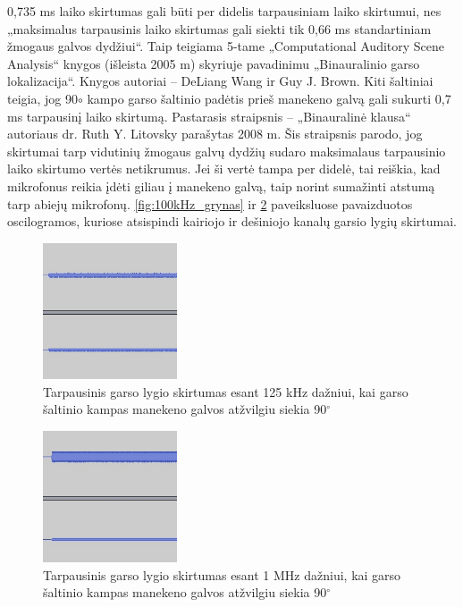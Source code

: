 \documentclass[]{vgtuef}
\begin{document}
0,735 ms laiko skirtumas gali būti per didelis tarpausiniam laiko skirtumui, nes „maksimalus tarpausinis laiko skirtumas gali siekti tik 0,66 ms standartiniam žmogaus galvos dydžiui“. Taip teigiama 5-tame „Computational Auditory Scene Analysis“ knygos (išleista 2005 m) skyriuje pavadinimu „Binauralinio garso lokalizacija“. Knygos autoriai – DeLiang Wang ir Guy J. Brown. Kiti šaltiniai teigia, jog 90$\circ$ kampo garso šaltinio padėtis prieš manekeno galvą gali sukurti 0,7 ms tarpausinį laiko skirtumą. Pastarasis straipsnis – „Binauralinė klausa“ autoriaus dr. Ruth Y. Litovsky parašytas 2008 m. Šis straipsnis parodo, jog skirtumai tarp vidutinių žmogaus galvų dydžių sudaro maksimalaus tarpausinio laiko skirtumo vertės netikrumus. Jei ši vertė tampa per didelė, tai reiškia, kad mikrofonus reikia įdėti giliau į manekeno galvą, taip norint sumažinti atstumą tarp abiejų mikrofonų. \ref{fig:100kHz_grynas} ir \ref{fig:1000kHz_TGLS} paveiksluose pavaizduotos oscilogramos, kuriose atsispindi kairiojo ir dešiniojo kanalų garsio lygių skirtumai.

\begin{figure}[!h]
  \centering
  \includegraphics[width=150px]{img/125kHz_TGLS.png}
  \caption{Tarpausinis garso lygio skirtumas esant 125 kHz dažniui, kai garso šaltinio kampas manekeno galvos atžvilgiu siekia 90$^\circ$}
  \label{fig:125kHz_TGLS}
\end{figure}

\begin{figure}[!h]
  \centering
  \includegraphics[width=150px]{img/1000kHz_TGLS.png}
  \caption{Tarpausinis garso lygio skirtumas esant 1 MHz dažniui, kai garso šaltinio kampas manekeno galvos atžvilgiu siekia 90$^\circ$}
  \label{fig:1000kHz_TGLS}
\end{figure}
\end{document}
